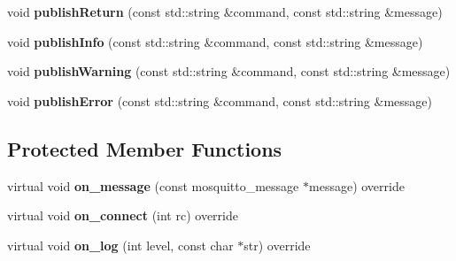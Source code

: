 \begin{DoxyCompactItemize}
\item 
void {\bfseries publish\+Return} (const std\+::string \&command, const std\+::string \&message)\hypertarget{class_command_processor_ae97c2e58deecce8bd6dac0d081d73f03}{}\label{class_command_processor_ae97c2e58deecce8bd6dac0d081d73f03}

\item 
void {\bfseries publish\+Info} (const std\+::string \&command, const std\+::string \&message)\hypertarget{class_command_processor_a0f5c17ab23203abee8a48c82f3338a28}{}\label{class_command_processor_a0f5c17ab23203abee8a48c82f3338a28}

\item 
void {\bfseries publish\+Warning} (const std\+::string \&command, const std\+::string \&message)\hypertarget{class_command_processor_a0691a985030ebb0cef833aa779bedeab}{}\label{class_command_processor_a0691a985030ebb0cef833aa779bedeab}

\item 
void {\bfseries publish\+Error} (const std\+::string \&command, const std\+::string \&message)\hypertarget{class_command_processor_a81e3fda8d03c8f5aea99a442ebdb0050}{}\label{class_command_processor_a81e3fda8d03c8f5aea99a442ebdb0050}

\end{DoxyCompactItemize}
\subsection*{Protected Member Functions}
\begin{DoxyCompactItemize}
\item 
virtual void {\bfseries on\+\_\+message} (const mosquitto\+\_\+message $\ast$message) override\hypertarget{class_command_processor_ab1a2cf5d74c8bbd9bbcf57c7a4b14c66}{}\label{class_command_processor_ab1a2cf5d74c8bbd9bbcf57c7a4b14c66}

\item 
virtual void {\bfseries on\+\_\+connect} (int rc) override\hypertarget{class_command_processor_a242db95796f5dd1b17a139ed19d6ecfa}{}\label{class_command_processor_a242db95796f5dd1b17a139ed19d6ecfa}

\item 
virtual void {\bfseries on\+\_\+log} (int level, const char $\ast$str) override\hypertarget{class_command_processor_a7300ca2e9cd0237f17ce82f64123e553}{}\label{class_command_processor_a7300ca2e9cd0237f17ce82f64123e553}

\end{DoxyCompactItemize}
